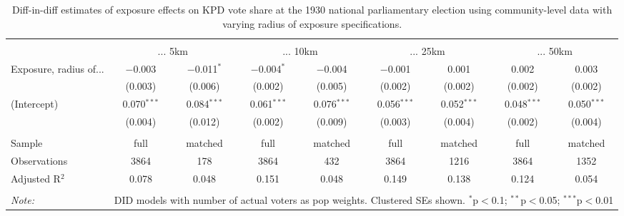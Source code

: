 
\begin{table}[!htbp] \centering 
  \caption{Diff-in-diff estimates of exposure effects on KPD vote share at the 1930 national parliamentary election using community-level data with varying radius of exposure specifications.\vspace{-.25cm}} 
  \label{tab:voteshare-kpd-radius-dd} 
\scriptsize 
\begin{tabular}{@{\extracolsep{5pt}}lcccccccc} 
\\[-1.8ex]\hline 
\hline \\[-1.8ex] 
 & \multicolumn{2}{c}{... 5km} & \multicolumn{2}{c}{... 10km} & \multicolumn{2}{c}{... 25km} & \multicolumn{2}{c}{... 50km} \\ 
 \cmidrule(r){2-3}\cmidrule(r){4-5}\cmidrule(r){6-7}\cmidrule(r){8-9}Exposure, radius of... & $-$0.003 & $-$0.011$^{*}$ & $-$0.004$^{*}$ & $-$0.004 & $-$0.001 & 0.001 & 0.002 & 0.003 \\ 
  & (0.003) & (0.006) & (0.002) & (0.005) & (0.002) & (0.002) & (0.002) & (0.002) \\ 
  (Intercept) & 0.070$^{***}$ & 0.084$^{***}$ & 0.061$^{***}$ & 0.076$^{***}$ & 0.056$^{***}$ & 0.052$^{***}$ & 0.048$^{***}$ & 0.050$^{***}$ \\ 
  & (0.004) & (0.012) & (0.002) & (0.009) & (0.003) & (0.004) & (0.002) & (0.004) \\ 
 \hline \\[-1.8ex] 
Sample & full & matched & full & matched & full & matched & full & matched \\ 
Observations & 3864 & 178 & 3864 & 432 & 3864 & 1216 & 3864 & 1352 \\ 
Adjusted R$^{2}$ & 0.078 & 0.048 & 0.151 & 0.048 & 0.149 & 0.138 & 0.124 & 0.054 \\ 
\hline 
\hline \\[-1.8ex] 
\textit{Note:}  & \multicolumn{8}{r}{DID models with number of actual voters as pop weights. Clustered SEs shown. $^{*}$p$<$0.1; $^{**}$p$<$0.05; $^{***}$p$<$0.01} \\ 
\end{tabular} 
\end{table} 
